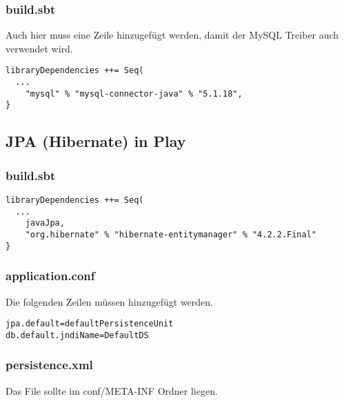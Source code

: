 \documentclass[11pt, a4paper]{article}
\begin{document}
\subsubsection*{build.sbt}

Auch hier muss eine Zeile hinzugefügt werden, damit der MySQL Treiber auch verwendet wird.
\begin{lstlisting}
libraryDependencies ++= Seq(
  ...
	"mysql" % "mysql-connector-java" % "5.1.18",
}\end{lstlisting}

\subsection{JPA (Hibernate) in Play}

\subsubsection*{build.sbt}

\begin{lstlisting}
libraryDependencies ++= Seq(
  ...
	javaJpa,
	"org.hibernate" % "hibernate-entitymanager" % "4.2.2.Final"
}\end{lstlisting}

\subsubsection*{application.conf}

Die folgenden Zeilen müssen hinzugefügt werden.

\begin{lstlisting}
jpa.default=defaultPersistenceUnit
db.default.jndiName=DefaultDS
\end{lstlisting}

\subsubsection*{persistence.xml}

Das File sollte im conf/META-INF Ordner liegen.
\end{document}
